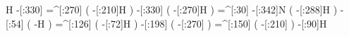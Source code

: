             H%
     -[:330]%
    =^[:270]%
               (
         -[:210]H%
               )
     -[:330]%
               (
         -[:270]H%
               )
     =^[:30]%
     -[:342]N%
               (
         -[:288]H%
               )
      -[:54]%
               (
               -H%
               )
    =^[:126]%
               (
          -[:72]H%
               )
     -[:198]%
               (
         -[:270]%
               )
    =^[:150]%
               (
         -[:210]%
               )
      -[:90]H%